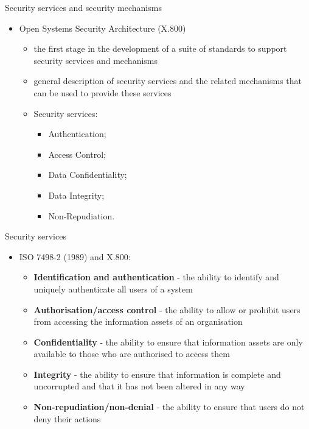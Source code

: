 \documentclass[pdf]{beamer}
\begin{document}
\begin{frame}{Security services and security mechanisms}
\begin{itemize}
\item
Open Systems Security Architecture (X.800)
\begin{itemize}
\item
the first stage in the development of 
a suite of standards to support security services and mechanisms
\item 
general description of security services and the related mechanisms that can be used to provide these services
\item
Security services:
\begin{itemize}
\item
Authentication;
\item
Access Control;
\item
Data Confidentiality;
\item
Data Integrity;
\item
Non-Repudiation.
\end{itemize}
\end{itemize}

\end{itemize}
\end{frame}



\begin{frame}{Security services}
\begin{itemize}
\item
ISO 7498-2 (1989) and X.800:
\begin{itemize}
\item
\textbf{Identification and authentication} - the ability to identify and uniquely authenticate all users of a system
\item
\textbf{Authorisation/access control} - the ability to allow or prohibit users from accessing the information assets of an organisation
\item
\textbf{Confidentiality} - the ability to ensure that information assets are only available to those who are authorised to access them
\item
\textbf{Integrity} - the ability to ensure that information is complete and uncorrupted and that it has not been altered in any way
\item
\textbf{Non-repudiation/non-denial} - the ability to ensure that users do not deny their actions
\end{itemize}
\end{itemize}
\end{frame}
\end{document}
